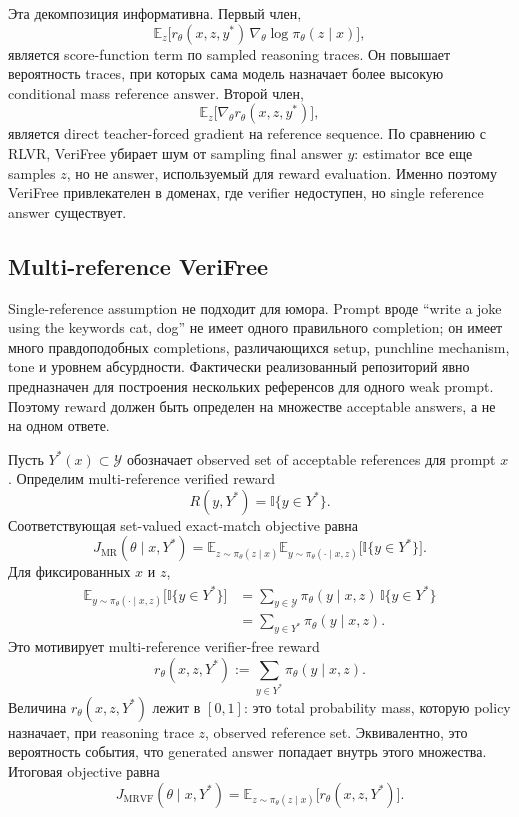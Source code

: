 Эта декомпозиция информативна. Первый член,
\[
    \mathbb{E}_{z}\big[r_{\theta}(x,z,y^{*})\,\nabla_{\theta}\log\pi_{\theta}(z\mid x)\big],
\]
является score-function term по sampled reasoning traces. Он повышает вероятность traces, при которых сама модель назначает более высокую conditional mass reference answer. Второй член,
\[
    \mathbb{E}_{z}\big[\nabla_{\theta}r_{\theta}(x,z,y^{*})\big],
\]
является direct teacher-forced gradient на reference sequence. По сравнению с RLVR, VeriFree убирает шум от sampling final answer \(y\): estimator все еще samples \(z\), но не answer, используемый для reward evaluation. Именно поэтому VeriFree привлекателен в доменах, где verifier недоступен, но single reference answer существует.

\subsection{Multi-reference VeriFree}

Single-reference assumption не подходит для юмора. Prompt вроде ``write a joke using the keywords cat, dog'' не имеет одного правильного completion; он имеет много правдоподобных completions, различающихся setup, punchline mechanism, tone и уровнем абсурдности. Фактически реализованный репозиторий явно предназначен для построения нескольких референсов для одного weak prompt. Поэтому reward должен быть определен на множестве acceptable answers, а не на одном ответе.

Пусть \(Y^{*}(x)\subset\mathcal{Y}\) обозначает observed set of acceptable references для prompt \(x\). Определим multi-reference verified reward
\[
    R(y,Y^{*})=\mathbb{I}\{y\in Y^{*}\}.
\]
Соответствующая set-valued exact-match objective равна
\[
    J_{\mathrm{MR}}(\theta\mid x,Y^{*})
    =
    \mathbb{E}_{z\sim\pi_{\theta}(z\mid x)}
    \mathbb{E}_{y\sim\pi_{\theta}(\cdot\mid x,z)}
    \big[\mathbb{I}\{y\in Y^{*}\}\big].
\]
Для фиксированных \(x\) и \(z\),
\begin{align*}
    \mathbb{E}_{y\sim\pi_{\theta}(\cdot\mid x,z)}
    \big[\mathbb{I}\{y\in Y^{*}\}\big]
     & =
    \sum_{y\in\mathcal{Y}}
    \pi_{\theta}(y\mid x,z)\,\mathbb{I}\{y\in Y^{*}\} \\
     & =
    \sum_{y\in Y^{*}}
    \pi_{\theta}(y\mid x,z).
\end{align*}
Это мотивирует multi-reference verifier-free reward
\[
    r_{\theta}(x,z,Y^{*})
    :=
    \sum_{y\in Y^{*}}
    \pi_{\theta}(y\mid x,z).
\]
Величина \(r_{\theta}(x,z,Y^{*})\) лежит в \([0,1]\): это total probability mass, которую policy назначает, при reasoning trace \(z\), observed reference set. Эквивалентно, это вероятность события, что generated answer попадает внутрь этого множества. Итоговая objective равна
\[
    J_{\mathrm{MRVF}}(\theta\mid x,Y^{*})
    =
    \mathbb{E}_{z\sim\pi_{\theta}(z\mid x)}
    \big[r_{\theta}(x,z,Y^{*})\big].
\]

